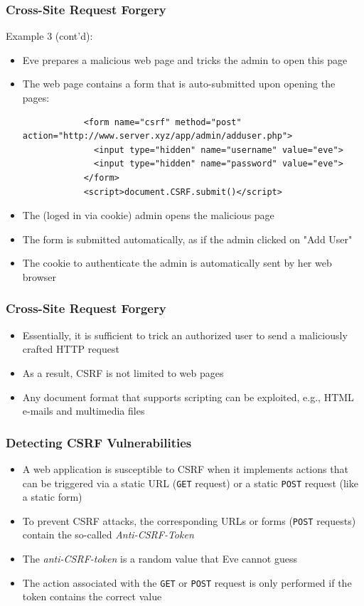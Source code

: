 \begin{frame}[fragile]
    \frametitle{Cross-Site Request Forgery}
    Example 3 (cont'd):
    \begin{itemize}
        \item Eve prepares a malicious web page and tricks the admin to open this page
        \item The web page contains a form that is auto-submitted upon opening the pages:
        \begin{verbatim}
            <form name="csrf" method="post" action="http://www.server.xyz/app/admin/adduser.php">
              <input type="hidden" name="username" value="eve">
              <input type="hidden" name="password" value="eve">
            </form>
            <script>document.CSRF.submit()</script>
        \end{verbatim}
        \item The (loged in via cookie) admin opens the malicious page
        \item The form is submitted automatically, as if the admin clicked on "Add User"
        \item The cookie to authenticate the admin is automatically sent by her web browser
    \end{itemize}
\end{frame}

\begin{frame}
    \frametitle{Cross-Site Request Forgery}
    \begin{itemize}
        \item Essentially, it is sufficient to trick an authorized user to send a maliciously crafted HTTP request
        \item As a result, CSRF is not limited to web pages
        \item Any document format that supports scripting can be exploited, e.g., HTML e-mails and multimedia files
    \end{itemize}
\end{frame}

\begin{frame}
    \frametitle{Detecting CSRF Vulnerabilities}
    \begin{itemize}
        \item A web application is susceptible to CSRF when it implements actions that can be triggered via a static URL (\texttt{GET} request) or a static \texttt{POST} request (like a static form)
        \item To prevent CSRF attacks, the corresponding URLs or forms (\texttt{POST} requests) contain the so-called \emph{Anti-CSRF-Token}
        \item The \emph{anti-CSRF-token} is a random value that Eve cannot guess
        \item The action associated with the \texttt{GET} or \texttt{POST} request is only performed if the token contains the correct value
    \end{itemize}
\end{frame}

